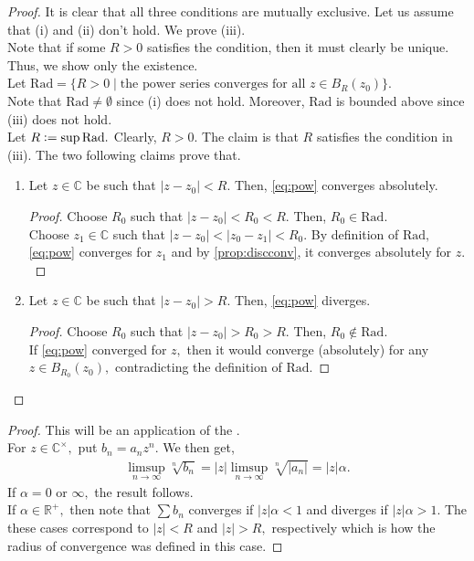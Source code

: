 \regconv*\label{thm:regconv2}
\begin{flushright}\hyperref[thm:regconv]{\upsym}\end{flushright}
\begin{proof}
	It is clear that all three conditions are mutually exclusive. Let us assume that (i) and (ii) don't hold. We prove (iii).\\
	Note that if some $R > 0$ satisfies the condition, then it must clearly be unique. Thus, we show only the existence.\\
	Let $\text{Rad} = \{R > 0 \mid \text{the power series converges for all } z \in B_R(z_0)\}.$\\
	Note that $\text{Rad} \neq \emptyset$ since (i) does not hold. Moreover, $\text{Rad}$ is bounded above since (iii) does not hold. \\
	Let $R \vcentcolon= \sup \text{Rad}.$ Clearly, $R > 0.$ The claim is that $R$ satisfies the condition in (iii). The two following claims prove that.
	\begin{enumerate}[label = Claim \arabic*.]
		\item Let $z \in \mathbb{C}$ be such that $|z - z_0| < R.$ Then, \cref{eq:pow} converges absolutely.
		\begin{proof} 
			Choose $R_0$ such that $|z - z_0| < R_0 < R.$ Then, $R_0 \in \text{Rad}.$\\
			Choose $z_1 \in \mathbb{C}$ such that $|z - z_0| < |z_0 - z_1| < R_0.$ By definition of $\text{Rad},$ \cref{eq:pow} converges for $z_1$ and by \cref{prop:discconv}, it converges absolutely for $z.$
		\end{proof}
		\item Let $z \in \mathbb{C}$ be such that $|z - z_0| > R.$ Then, \cref{eq:pow} diverges.
		\begin{proof} 
			Choose $R_0$ such that $|z - z_0| > R_0 > R.$ Then, $R_0 \notin \text{Rad}.$\\
			If \cref{eq:pow} converged for $z,$ then it would converge (absolutely) for any $z \in B_{R_0}(z_0),$ contradicting the definition of $\text{Rad}.$
		\end{proof}
	\end{enumerate}
\end{proof}

\radconvcalc*\label{thm:radconvcalc2}
\begin{flushright}\hyperref[thm:radconvcalc]{\upsym}\end{flushright}
\begin{proof}
	This will be an application of the .\\
	For $z \in \mathbb{C}^\times,$ put $b_n = a_nz^n.$ We then get,
	\begin{align*} 
		\limsup_{n\to\infty}\sqrt[n]{b_n} = |z|\limsup_{n\to\infty}\sqrt[n]{|a_n|} = |z|\alpha.
	\end{align*}
	If $\alpha = 0$ or $\infty,$ the result follows.\\
	If $\alpha \in \mathbb{R}^+,$ then note that $\sum b_n$ converges if $|z|\alpha < 1$ and diverges if $|z|\alpha > 1.$ The these cases correspond to $|z| < R$ and $|z| > R,$ respectively which is how the radius of convergence was defined in this case.
\end{proof}

